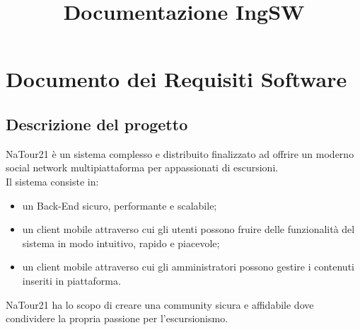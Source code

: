 \documentclass{natourDoc}
\title{Documentazione IngSW} %
\begin{document}





\marginscreate %
\cover %
\toc %

\newpage
\section{Documento dei Requisiti Software}
\subsection{Descrizione del progetto}
NaTour21 è un sistema complesso e distribuito finalizzato ad offrire un moderno social network multipiattaforma per appassionati di escursioni.\\

Il sistema consiste in:
\begin{itemize}
	\item un Back-End sicuro, performante e scalabile;
	\item un client mobile attraverso cui gli
	      utenti possono fruire delle funzionalità del sistema in modo intuitivo, rapido e piacevole;
	\item un client mobile attraverso cui gli amministratori possono gestire i contenuti inseriti in piattaforma.\\
\end{itemize}

NaTour21 ha lo scopo di creare una community sicura e affidabile dove condividere la propria passione per l'escursionismo.\\
\end{document}
